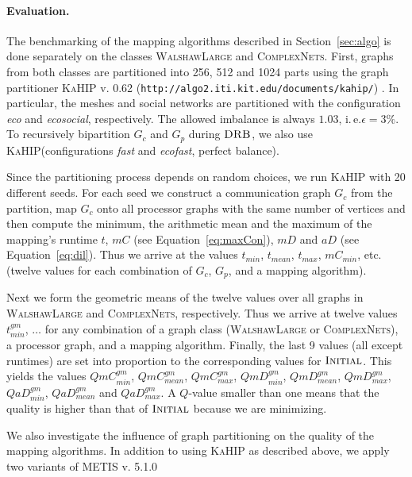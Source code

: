 \documentclass[pdftex]{llncs}
\newcommand{\ie}{i.\,e.\xspace}
\newcommand{\metis}{\textsc{METIS}\xspace}
\newcommand{\kahip}{\textsc{KaHIP}\xspace}
\newcommand{\initial}{\textsc{Initial}\xspace}
\newcommand{\durebi}{\textsc{DRB}\xspace}
\newcommand{\walshawlarge}{\textsc{WalshawLarge}\xspace}
\newcommand{\complexnets}{\textsc{ComplexNets}\xspace}
\begin{document}
\paragraph{Evaluation.}
\label{sub:exp-evaluation}
The benchmarking of the mapping algorithms described in
Section~\ref{sec:algo} is done separately on the classes \walshawlarge
and \complexnets. First, graphs from both classes are partitioned into
256, 512 and 1024 parts using the graph partitioner \kahip v. 0.62
({\tt http://algo2.iti.kit.edu/documents/kahip/})
\cite{dissSchulz}.
In particular,
the meshes and social networks are partitioned with the configuration
\emph{eco} and \emph{ecosocial}, respectively. The allowed imbalance
is always $1.03$, \ie $\epsilon = 3\%$. To recursively bipartition $G_c$ and $G_p$ during
$\durebi$, we also use \kahip (configurations \emph{fast} and
\emph{ecofast}, perfect balance).

Since the partitioning process depends on random choices, we run \kahip with 20
different seeds.  For each seed we construct a communication graph
$G_c$ from the partition, map $G_c$ onto all processor graphs with the
same number of vertices and then compute the minimum, the arithmetic
mean and the maximum of the mapping's runtime $t$, $mC$ (see
Equation~\ref{eq:maxCon}), $mD$ and $aD$ (see
Equation~\ref{eq:dil}). Thus we arrive at the values $t_{min}$,
$t_{mean}$, $t_{max}$, $mC_{min}$, etc. (twelve values for each
combination of $G_c$, $G_p$, and a mapping algorithm).

Next we form the geometric means of the twelve values over all graphs
in \walshawlarge and \complexnets, respectively. Thus we arrive at
twelve values $t^{gm}_{min}$, $\dots$ for any combination of a graph
class (\walshawlarge or \complexnets), a processor graph, and a
mapping algorithm. Finally, the last 9 values (all except runtimes) are
set into proportion to the corresponding values for $\initial$. This
yields the values $QmC^{gm}_{min}$, $QmC^{gm}_{mean}$,
$QmC^{gm}_{max}$, $QmD^{gm}_{min}$, $QmD^{gm}_{mean}$,
$QmD^{gm}_{max}$, $QaD^{gm}_{min}$, $QaD^{gm}_{mean}$ and
$QaD^{gm}_{max}$. A $Q$-value smaller than one means that the
quality is higher than that of $\initial$ because we are minimizing.

We also investigate the influence of graph partitioning on the quality
of the mapping algorithms. In addition to using \kahip as described
above, we apply two variants of \metis v. 5.1.0~\cite{Karypis13a}
\end{document}
